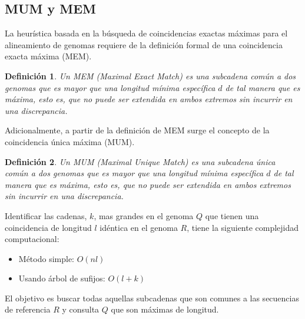 \documentclass[12pt,a4paper]{article}
\newtheorem{mydef}{Definición}
\begin{document}
\subsection{MUM y MEM} 
\indent
La heurística basada en la búsqueda de coincidencias exactas máximas para el alineamiento de genomas requiere de la definición formal de una coincidencia exacta máxima (MEM).\\
\begin{mydef}
  Un MEM (Maximal Exact Match) es una subcadena común a dos
  genomas que es mayor que una longitud mínima específica $d$ de tal manera
  que es máxima, esto es, que no puede ser extendida en ambos extremos sin
  incurrir en una discrepancia. 
\end{mydef}
\indent
Adicionalmente, a partir de la definición de MEM surge el concepto de la coincidencia única máxima (MUM).\\
\begin{mydef}Un MUM (Maximal Unique Match) es una subcadena única común a dos genomas que es mayor que una longitud mínima específica $d$ de tal manera que es máxima, esto es, que no puede ser extendida en ambos extremos sin incurrir en una discrepancia.
\end{mydef}
Identificar las cadenas, $k$, mas grandes en el genoma $Q$ que tienen una coincidencia de longitud $l$ idéntica en el genoma $R$, tiene la siguiente complejidad computacional:
\begin{itemize}
  \item Método simple: $O(nl)$
  \item Usando árbol de sufijos: $O(l+k)$
\end{itemize}
\indent
El objetivo es buscar todas aquellas subcadenas que son comunes a las secuencias de referencia $R$ y consulta $Q$ que son máximas de longitud.\\
\end{document}
